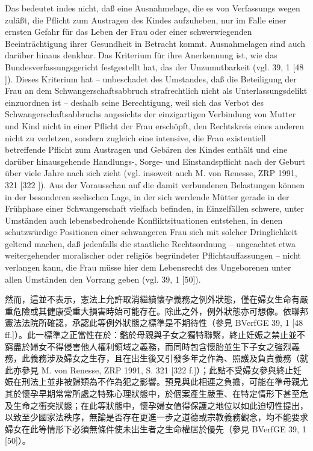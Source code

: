 \documentclass[12pt]{article}
\begin{document}
\begin{sourcepara}[title={原文D.50}]
Das bedeutet indes nicht, daß eine Ausnahmelage, die es von Verfassungs wegen zuläßt, die Pflicht zum Austragen des Kindes aufzuheben, nur im Falle einer ernsten Gefahr für das Leben der Frau oder einer schwerwiegenden Beeinträchtigung ihrer Gesundheit in Betracht kommt. Ausnahmelagen sind auch darüber hinaus denkbar. Das Kriterium für ihre Anerkennung ist, wie das Bundesverfassungsgericht festgestellt hat, das der Unzumutbarkeit (vgl. \abbrBVerfGE{} 39, 1 [48 \abbrFF{}]). Dieses Kriterium hat -- unbeschadet des Umstandes, daß die Beteiligung der Frau an dem Schwangerschaftsabbruch strafrechtlich nicht als Unterlassungsdelikt einzuordnen ist -- deshalb seine Berechtigung, weil sich das Verbot des Schwangerschaftsabbruchs angesichts der einzigartigen Verbindung von Mutter und Kind nicht in einer Pflicht der Frau erschöpft, den Rechtskreis eines anderen nicht zu verletzen, sondern zugleich eine intensive, die Frau existentiell betreffende Pflicht zum Austragen und Gebären des Kindes enthält und eine darüber hinausgehende Handlungs-, Sorge- und Einstandspflicht nach der Geburt über viele Jahre nach sich zieht (vgl. insoweit auch M. von Renesse, ZRP 1991, \abbrS{} 321 [322 \abbrF{}]). Aus der Vorausschau auf die damit verbundenen Belastungen können in der besonderen seelischen Lage, in der sich werdende Mütter gerade in der Frühphase einer Schwangerschaft vielfach befinden, in Einzelfällen schwere, unter Umständen auch lebensbedrohende Konfliktsituationen entstehen, in denen schutzwürdige Positionen einer schwangeren Frau sich mit solcher Dringlichkeit geltend machen, daß jedenfalls die staatliche Rechtsordnung -- ungeachtet etwa weitergehender moralischer oder religiös begründeter Pflichtauffassungen -- nicht verlangen kann, die Frau müsse hier dem Lebensrecht des Ungeborenen unter allen Umständen den Vorrang geben (vgl. \abbrBVerfGE{} 39, 1 [50]).
\end{sourcepara}
\begin{transpara}
然而，這並不表示，憲法上允許取消繼續懷孕義務之例外狀態，僅在婦女生命有嚴重危險或其健康受重大損害時始可能存在。除此之外，例外狀態亦可想像。依聯邦憲法法院所確認，承認此等例外狀態之標準是不期待性（參見 BVerfGE 39, 1 [48 ff.]）。此一標準之正當性在於：鑑於母親與子女之獨特聯繫，終止妊娠之禁止並不窮盡於婦女不得侵害他人權利領域之義務，而同時包含懷胎並生下子女之強烈義務，此義務涉及婦女之生存，且在出生後又引發多年之作為、照護及負責義務（就此亦參見 M. von Renesse, ZRP 1991, S. 321 [322 f.]）；此點不受婦女參與終止妊娠在刑法上並非被歸類為不作為犯之影響。預見與此相連之負擔，可能在準母親尤其於懷孕早期常常所處之特殊心理狀態中，於個案產生嚴重、在特定情形下甚至危及生命之衝突狀態；在此等狀態中，懷孕婦女值得保護之地位以如此迫切性提出，以致至少國家法秩序，無論是否存在更進一步之道德或宗教義務觀念，均不能要求婦女在此等情形下必須無條件使未出生者之生命權居於優先（參見 BVerfGE 39, 1 [50]）。
\end{transpara}
\end{document}
